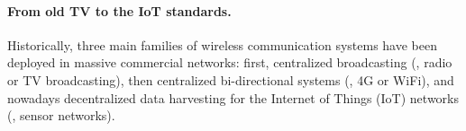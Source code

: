 \paragraph{From old TV to the IoT standards.}
%
Historically, three main families of wireless communication systems have been deployed in massive commercial networks: first, centralized broadcasting (\eg, radio or TV broadcasting), then centralized bi-directional systems (\eg, 4G or WiFi), and nowadays decentralized data harvesting for the Internet of Things (IoT) networks (\eg, sensor networks).
%
%
